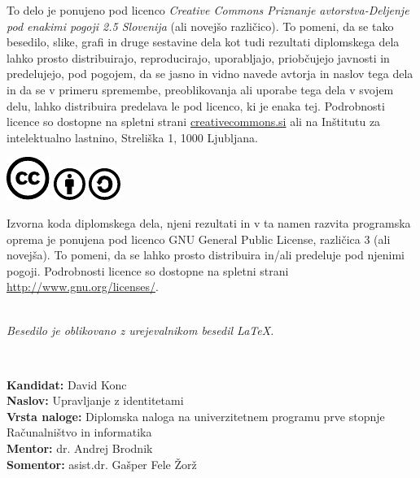 \documentclass[a4paper,12pt,openright,oneside]{book}
\newcommand{\clearemptydoublepage}{\newpage{\pagestyle{empty}\cleardoublepage}}
\newcommand{\CcImageCc}[1]{%
	\includegraphics[scale=#1]{cc_cc_30.pdf}%
}
\newcommand{\CcImageBy}[1]{%
	\includegraphics[scale=#1]{cc_by_30.pdf}%
}
\newcommand{\CcImageSa}[1]{%
	\includegraphics[scale=#1]{cc_sa_30.pdf}%
}
\begin{document}
\newpage
\thispagestyle{empty}

\vspace*{5cm}
{\small \noindent
To delo je ponujeno pod licenco \textit{Creative Commons Priznanje avtorstva-Deljenje pod enakimi pogoji 2.5 Slovenija} (ali novej\v so razli\v cico).
To pomeni, da se tako besedilo, slike, grafi in druge sestavine dela kot tudi rezultati diplomskega dela lahko prosto distribuirajo,
reproducirajo, uporabljajo, priobčujejo javnosti in predelujejo, pod pogojem, da se jasno in vidno navede avtorja in naslov tega
dela in da se v primeru spremembe, preoblikovanja ali uporabe tega dela v svojem delu, lahko distribuira predelava le pod
licenco, ki je enaka tej.
Podrobnosti licence so dostopne na spletni strani \href{http://creativecommons.si}{creativecommons.si} ali na Inštitutu za
intelektualno lastnino, Streliška 1, 1000 Ljubljana.

\vspace*{1cm}
\begin{center}%
\CcImageCc{0.741573033707865}\hspace*{1ex}\CcImageBy{1}\hspace*{1ex}\CcImageSa{1}%
\end{center}
}

\vspace*{1cm}
{\small \noindent
Izvorna koda diplomskega dela, njeni rezultati in v ta namen razvita programska oprema je ponujena pod licenco GNU General Public License,
različica 3 (ali novejša). To pomeni, da se lahko prosto distribuira in/ali predeluje pod njenimi pogoji.
Podrobnosti licence so dostopne na spletni strani \url{http://www.gnu.org/licenses/}.
}

\vfill
\begin{center} 
\ \\ \vfill
{\em
Besedilo je oblikovano z urejevalnikom besedil \LaTeX.}
\end{center}

\clearemptydoublepage

\thispagestyle{empty}
\
\vfill

\bigskip
\noindent\textbf{Kandidat:} David Konc\\
\noindent\textbf{Naslov:} Upravljanje z identitetami\\
\noindent\textbf{Vrsta naloge:} Diplomska naloga na univerzitetnem programu prve stopnje Računalništvo in informatika \\
\noindent\textbf{Mentor:} dr. Andrej Brodnik\\
\noindent\textbf{Somentor:} asist.dr. Gašper Fele Žorž
\end{document}
